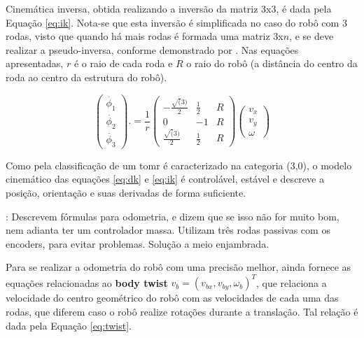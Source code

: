 Cinemática inversa, obtida realizando a inversão da matriz 3x3, é dada pela Equação \ref{eq:ik}. Nota-se que esta inversão é simplificada no caso do robô com 3 rodas, visto que quando há mais rodas é formada uma matriz 3x$n$, e se deve realizar a pseudo-inversa, conforme demonstrado por \cite{rojas2006holonomic}. Nas equações apresentadas, $r$ é o raio de cada roda e $R$ o raio do robô (a distância do centro da roda ao centro da estrutura do robô).

\begin{equation}
  \begin{pmatrix}
    \dot{\phi_1} \\
    \dot{\phi_2} \\
    \dot{\phi_3}
  \end{pmatrix}.
  =
  \frac{1}{r}
  \begin{pmatrix}
    -\frac{\sqrt(3)}{2} & \frac{1}{2} & R \\
    0                   & -1          & R \\
    \frac{\sqrt(3)}{2}  & \frac{1}{2} & R
  \end{pmatrix}
  \begin{pmatrix}
    v_x \\
    v_y \\
    \omega
  \end{pmatrix}
  \label{eq:ik}
\end{equation}

Como pela classificação de \cite{campion1996structural} um \acrshort{tomr} é caracterizado na categoria (3,0), o modelo cinemático das equações \ref{eq:dk} e \ref{eq:ik} é controlável, estável e descreve a posição, orientação e suas derivadas de forma suficiente. %

\cite{samani2007comprehensive}: Descrevem fórmulas para odometria, e dizem que se isso não for muito bom, nem adianta ter um controlador massa. Utilizam três rodas passivas com os encoders, para evitar problemas. Solução a meio enjambrada.

Para se realizar a odometria do robô com uma precisão melhor, \cite{lynch2017modern} ainda fornece as equações relacionadas ao \textbf{body twist} $v_b = (v_{bx}, v_{by}, \omega_b)^T$, que relaciona a velocidade do centro geométrico do robô com as velocidades de cada uma das rodas, que diferem caso o robô realize rotações durante a translação. Tal relação é dada pela Equação \ref{eq:twist}.

